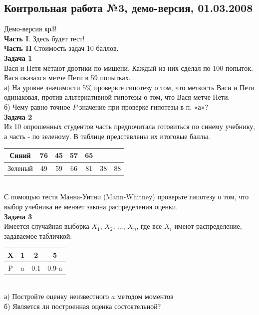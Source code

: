 \documentclass[12pt, a4paper]{article}\usepackage[]{graphicx}\usepackage[]{color}
\begin{document}
	\subsection{Контрольная работа №3, демо-версия, 01.03.2008}

	Демо-версия кр3! \\
	\textbf{Часть I}. Здесь будет тест! \\
	\textbf{Часть II} Стоимость задач 10 баллов. \\

	\textbf{Задача 1} \\
	Вася и Петя метают дротики по мишени. Каждый из них сделал
	по 100 попыток. Вася оказался метче Пети в 59 попытках. \\
	а) На уровне
	значимости 5\% проверьте гипотезу о том, что меткость Васи и Пети
	одинаковая, против альтернативной гипотезы о том, что Вася метче
	Пети. \\
	б) Чему равно точное $P$-значение при проверке гипотезы в п. «а»? \\

	\textbf{Задача 2} \\ %
	Из 10 опрошенных студентов часть предпочитала готовиться по
	синему учебнику, а часть - по зеленому. В таблице представлены их
	итоговые баллы.  \\
	\begin{tabular}{c|cccccc}
		Синий & 76 & 45 & 57 & 65 &  &  \\
		\hline
		Зеленый & 49 & 59 & 66 & 81 & 38 & 88 \\
	\end{tabular} \\
	С помощью теста Манна-Уитни (Mann-Whitney) проверьте гипотезу о
	том, что выбор учебника не меняет закона распределения оценки. \\

	\textbf{Задача 3} \\ %
	Имеется случайная выборка $X_{1}$, $X_{2}$, ..., $X_{n}$, где все $X_{i}$ имеют распределение, задаваемое табличкой: \\
	\begin{tabular}{c|ccc}
		X & 1 & 2 & 5 \\
		\hline
		P & a & 0.1 & 0.9-a \\
	\end{tabular} \\
	а) Постройте оценку неизвестного $a$ методом моментов \\
	б) Является ли построенная оценка состоятельной? \\
\end{document}

